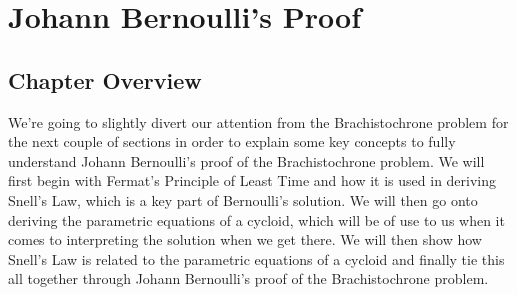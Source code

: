 \documentclass[12pt]{report}
\begin{document}
\chapter{Johann Bernoulli's Proof}
\section{Chapter Overview}
We're going to slightly divert our attention from the Brachistochrone problem for the next couple of sections in order to explain some key concepts to fully understand Johann Bernoulli's proof of the Brachistochrone problem. We will first begin with Fermat's Principle of Least Time and how it is used in deriving Snell's Law, which is a key part of Bernoulli's solution. We will then go onto deriving the parametric equations of a cycloid, which will be of use to us when it comes to interpreting the solution when we get there. We will then show how Snell's Law is related to the parametric equations of a cycloid and finally tie this all together through Johann Bernoulli's proof of the Brachistochrone problem.
\end{document}
